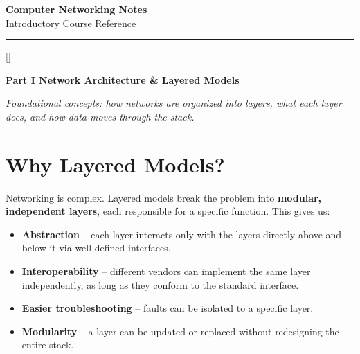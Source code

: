 \documentclass[11pt, letterpaper]{article}
\newcommand{\bluesections}{%
  \titleformat{\section}{\large\bfseries\color{sectionblue}}{}{0em}{}[\color{sectionblue}\titlerule]%
  \titleformat{\subsection}{\normalsize\bfseries\color{sectionblue!80!black}}{}{0em}{}%
}
\newcommand{\partbanner}[3]{%
  \begin{tcolorbox}[colback=#1, colframe=#2, boxrule=1.2pt, arc=4pt,
    left=8pt, right=8pt, top=6pt, bottom=6pt]
    \begin{center}{\LARGE\bfseries #3}\end{center}
  \end{tcolorbox}%
}
\begin{document}
\begin{center}
  {\Huge\bfseries Computer Networking Notes}\\[6pt]
  {\large Introductory Course Reference}\\[4pt]
  \rule{\textwidth}{0.8pt}
\end{center}

\vspace{8pt}
    \tableofcontents
\newpage

\bluesections
\partbanner{partbg}{sectionblue}{Part I \quad Network Architecture \& Layered Models}

\vspace{6pt}
\begin{center}\small\itshape
  Foundational concepts: how networks are organized into layers, what each layer does,
  and how data moves through the stack.
\end{center}
\vspace{4pt}

\section*{Why Layered Models?}

Networking is complex. Layered models break the problem into \textbf{modular, independent layers}, each responsible for a specific function. This gives us:

\begin{itemize}[noitemsep]
  \item \textbf{Abstraction} -- each layer interacts only with the layers directly above and below it via well-defined interfaces.
  \item \textbf{Interoperability} -- different vendors can implement the same layer independently, as long as they conform to the standard interface.
  \item \textbf{Easier troubleshooting} -- faults can be isolated to a specific layer.
  \item \textbf{Modularity} -- a layer can be updated or replaced without redesigning the entire stack.
\end{itemize}
\end{document}
